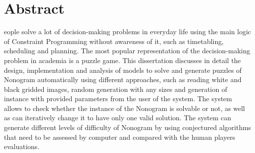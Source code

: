 \chapter*{Abstract}
\begin{SingleSpace}
eople solve a lot of decision-making problems in everyday life using the main logic of Constraint Programming without awareness of it, such as timetabling, scheduling and planning. The most popular representation of the decision-making problem in academia is a puzzle game.
This dissertation discusses in detail the design, implementation and analysis of models to solve and generate puzzles of Nonogram automatically using different approaches, such as reading white and black gridded images, random generation with any sizes and generation of instance with provided parameters from the user of the system. 
The system allows to check whether the instance of the Nonogram is solvable or not, as well as can iteratively change it to have only one valid solution. 
The system can generate different levels of difficulty of Nonogram by using conjectured algorithms that need to be assessed by computer and compared with the human players evaluations. 

\end{SingleSpace}
\clearpage